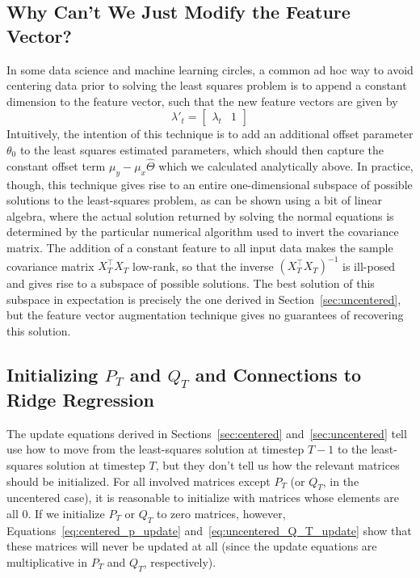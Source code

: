 \subsection{Why Can't We Just Modify the Feature Vector?}
In some data science and machine learning circles, a common ad hoc way to avoid centering data prior to solving the least squares problem is to append a constant dimension to the feature vector, such that the new feature vectors are given by 
\begin{equation}
  \lambda'_t = 
  \begin{bmatrix}
    \lambda_t & 1
  \end{bmatrix}
\end{equation}
Intuitively, the intention of this technique is to add an additional offset
parameter $\theta_0$ to the least squares estimated parameters, which should
then capture the constant offset term $\mu_y - \mu_x \hat\Theta$ which we
calculated analytically above. In practice, though, this technique gives rise
to an entire one-dimensional subspace of possible solutions to the
least-squares problem, as can be shown using a bit of linear algebra, where the
actual solution returned by solving the normal equations is determined by the
particular numerical algorithm used to invert the covariance matrix. The
addition of a constant feature to all input data makes the sample covariance
matrix $X_T^\top X_T$ low-rank, so that the inverse $(X_T^\top X_T)^{-1}$ is
ill-posed and gives rise to a subspace of possible solutions. The best solution
of this subspace in expectation is precisely the one derived in
Section~\ref{sec:uncentered}, but the feature vector augmentation technique
gives no guarantees of recovering this solution.

\subsection{Initializing $P_T$ and $Q_T$ and Connections to Ridge Regression}
The update equations derived in Sections~\ref{sec:centered}
and~\ref{sec:uncentered} tell use how to move from the least-squares solution
at timestep $T-1$ to the least-squares solution at timestep $T$, but they don't
tell us how the relevant matrices should be initialized. For all involved
matrices except $P_T$ (or $Q_T$, in the uncentered case), it is reasonable to
initialize with matrices whose elements are all 0. If we initialize $P_T$ or
$Q_T$ to zero matrices, however, Equations~\ref{eq:centered_p_update} and~\ref{eq:uncentered_Q_T_update} show that these matrices will never be updated at all (since the update equations are multiplicative in $P_T$ and $Q_T$, respectively). 

